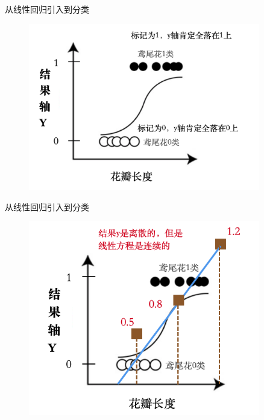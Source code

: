 \documentclass[handout]{ctexbeamer}
\begin{document}
\begin{frame}{从线性回归引入到分类}
\begin{figure}[H]
	\centering
	\includegraphics[width=0.9\textwidth]{fig/logisticreg1}
\end{figure}	
\end{frame}


\begin{frame}{从线性回归引入到分类}
\begin{figure}[H]
	\centering
	\includegraphics[width=0.9\textwidth]{fig/logisticreg2}
\end{figure}	
\end{frame}
\end{document}
